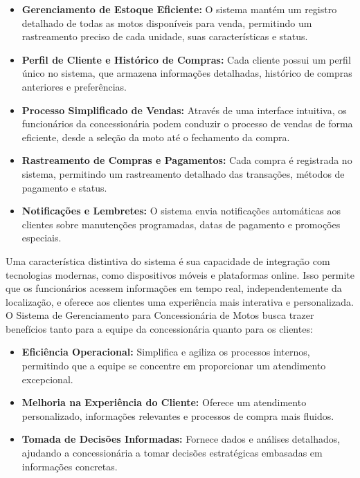         \begin{itemize}
        	\item \textbf{Gerenciamento de Estoque Eficiente:} O sistema mantém um registro detalhado de todas as motos disponíveis para venda, permitindo um rastreamento preciso de cada unidade, suas características e status.
        	
        	\item \textbf{Perfil de Cliente e Histórico de Compras:} Cada cliente possui um perfil único no sistema, que armazena informações detalhadas, histórico de compras anteriores e preferências.
        	
        	\item \textbf{Processo Simplificado de Vendas:} Através de uma interface intuitiva, os funcionários da concessionária podem conduzir o processo de vendas de forma eficiente, desde a seleção da moto até o fechamento da compra.
        	
        	\item \textbf{Rastreamento de Compras e Pagamentos:} Cada compra é registrada no sistema, permitindo um rastreamento detalhado das transações, métodos de pagamento e status.
        	
        	\item \textbf{Notificações e Lembretes:} O sistema envia notificações automáticas aos clientes sobre manutenções programadas, datas de pagamento e promoções especiais.
        \end{itemize}
    
        
        	Uma característica distintiva do sistema é sua capacidade de integração com tecnologias modernas, como dispositivos móveis e plataformas online. Isso permite que os funcionários acessem informações em tempo real, independentemente da localização, e oferece aos clientes uma experiência mais interativa e personalizada. O Sistema de Gerenciamento para Concessionária de Motos busca trazer benefícios tanto para a equipe da concessionária quanto para os clientes:
        	
        \begin{itemize}
        	\item \textbf{Eficiência Operacional:} Simplifica e agiliza os processos internos, permitindo que a equipe se concentre em proporcionar um atendimento excepcional.
        	
        	\item \textbf{Melhoria na Experiência do Cliente:} Oferece um atendimento personalizado, informações relevantes e processos de compra mais fluidos.
        	
        	\item \textbf{Tomada de Decisões Informadas:} Fornece dados e análises detalhados, ajudando a concessionária a tomar decisões estratégicas embasadas em informações concretas.
        \end{itemize}
        

